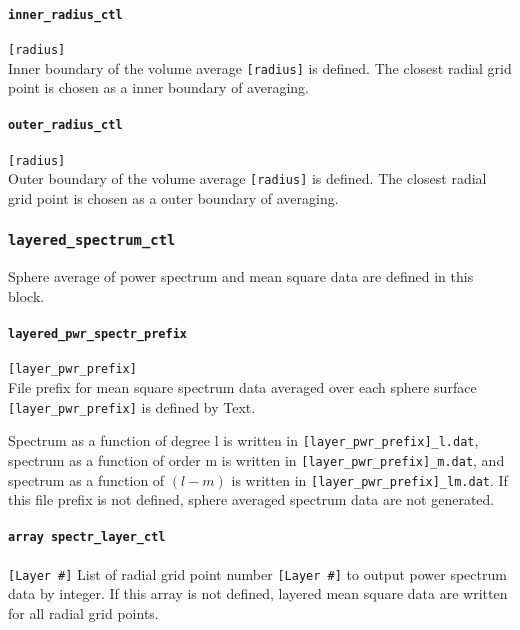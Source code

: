 \paragraph{\tt inner\_radius\_ctl}
\label{href_t:inner_radius_ctl}
\verb|[radius]| \\
Inner boundary of the volume average \verb|[radius]| is defined. The closest radial grid point is chosen as a inner boundary of averaging.

\paragraph{\tt outer\_radius\_ctl}
\label{href_t:outer_radius_ctl}
\verb|[radius]| \\
Outer boundary of the volume average \verb|[radius]| is defined. The closest radial grid point is chosen as a outer boundary of averaging.

%
\subsubsection{\tt layered\_spectrum\_ctl}
\label{href_t:layered_spectrum_ctl}
Sphere average of power spectrum and mean square data are defined in this block.

\paragraph{\tt layered\_pwr\_spectr\_prefix}
\label{href_t:layered_pwr_spectr_prefix}
\verb|[layer_pwr_prefix]| \\
File prefix for mean square spectrum data averaged over each sphere surface \verb|[layer_pwr_prefix]| is defined by Text.

Spectrum as a function of degree {l} is written in \verb|[layer_pwr_prefix]_l.dat|, spectrum as a function of order {m} is written in \verb|[layer_pwr_prefix]_m.dat|, and spectrum as a function of $(l-m)$ is written in \verb|[layer_pwr_prefix]_lm.dat|. If this file prefix is not defined, sphere averaged spectrum data are not generated. 

\paragraph{\tt array spectr\_layer\_ctl}
\label{href_t:spectr_layer_ctl}
\verb|[Layer #]|
List of radial grid point number \verb|[Layer #]| to output power spectrum data by integer. If this array is not defined, layered mean square data are written for all radial grid points.

